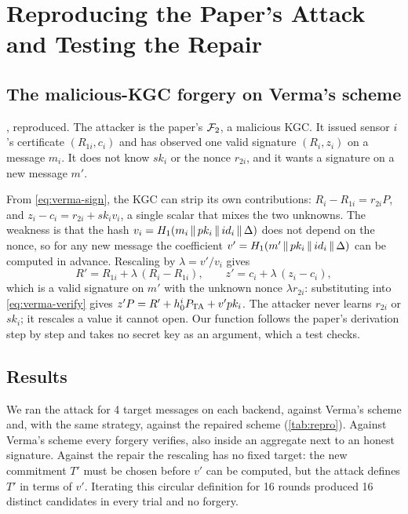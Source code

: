 \section{Reproducing the Paper's Attack and Testing the Repair}\label{sec:repro}

\subsection{The malicious-KGC forgery on Verma's scheme}\label{sec:repro-attack}
, reproduced. The attacker is the paper's $\mathcal{F}_2$, a malicious KGC. It issued sensor $i$'s
certificate $(R_{1i},c_i)$ and has observed one valid signature $(R_i,z_i)$ on a message $m_i$. It does
not know $sk_i$ or the nonce $r_{2i}$, and it wants a signature on a new message $m'$.

From \cref{eq:verma-sign}, the KGC can strip its own contributions: $R_i-R_{1i}=r_{2i}P$, and
$z_i-c_i=r_{2i}+sk_iv_i$, a single scalar that mixes the two unknowns. The weakness is that the hash
$v_i=H_1(m_i\,\|\, pk_i\,\|\, id_i\,\|\,\Delta)$ does not depend on the nonce, so for any new message
the coefficient $v'=H_1(m'\,\|\, pk_i\,\|\, id_i\,\|\,\Delta)$ can be computed in advance. Rescaling by
$\lambda=v'/v_i$ gives
\begin{equation}\label{eq:rescale}
R'=R_{1i}+\lambda\,(R_i-R_{1i}),\qquad z'=c_i+\lambda\,(z_i-c_i),
\end{equation}
which is a valid signature on $m'$ with the unknown nonce $\lambda r_{2i}$: substituting into
\cref{eq:verma-verify} gives $z'P=R'+h_0^iP_{\mathrm{TA}}+v'pk_i$. The attacker never learns $r_{2i}$ or $sk_i$; it
rescales a value it cannot open. Our function  follows the paper's derivation step by
step and takes no secret key as an argument, which a test checks.

\subsection{Results}
We ran the attack for 4 target messages on each backend, against Verma's scheme and, with the same
strategy, against the repaired scheme (\cref{tab:repro}). Against Verma's scheme every forgery verifies,
also inside an aggregate next to an honest signature. Against the repair the rescaling has no fixed
target: the new commitment $T'$ must be chosen before $v'$ can be computed, but the attack defines $T'$
in terms of $v'$. Iterating this circular definition for 16 rounds produced 16 distinct candidates in
every trial and no forgery.


